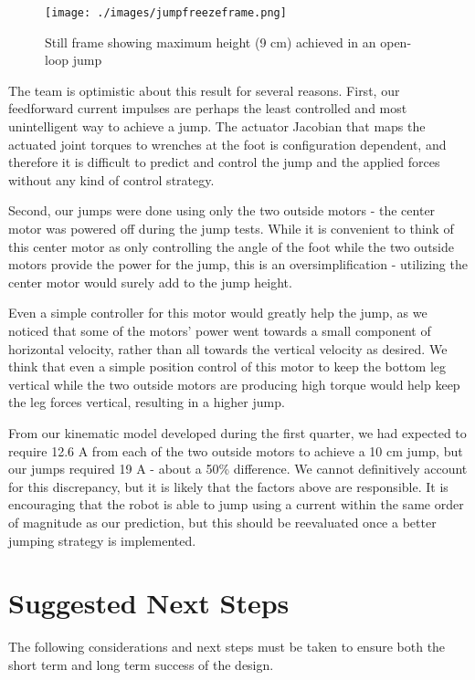 \documentclass{report}
\begin{document}
\begin{figure}[H]
\centering
\texttt{[image: ./images/jumpfreezeframe.png]}
\caption[Still frame showing maximum height (9 cm) achieved in an open-loop jump]{Still frame showing maximum height (9 cm) achieved in an open-loop jump}
\label{fig:jumpfreezeframe}
\end{figure}

The team is optimistic about this result for several reasons. First, our feedforward current impulses are perhaps the least controlled and most unintelligent way to achieve a jump. The actuator Jacobian that maps the actuated joint torques to wrenches at the foot is configuration dependent, and therefore it is difficult to predict and control the jump and the applied forces without any kind of control strategy. 

Second, our jumps were done using only the two outside motors - the center motor was powered off during the jump tests. While it is convenient to think of this center motor as only controlling the angle of the foot while the two outside motors provide the power for the jump, this is an oversimplification - utilizing the center motor would surely add to the jump height.

Even a simple controller for this motor would greatly help the jump, as we noticed that some of the motors' power went towards a small component of horizontal velocity, rather than all towards the vertical velocity as desired. We think that even a simple position control of this motor to keep the bottom leg vertical while the two outside motors are producing high torque would help keep the leg forces vertical, resulting in a higher jump.

From our kinematic model developed during the first quarter, we had expected to require 12.6 A from each of the two outside motors to achieve a 10 cm jump, but our jumps required 19 A - about a 50\% difference. We cannot definitively account for this discrepancy, but it is likely that the factors above are responsible. It is encouraging that the robot is able to jump using a current within the same order of magnitude as our prediction, but this should be reevaluated once a better jumping strategy is implemented.

\chapter[Suggested Next Steps]{Suggested Next Steps}
The following considerations and next steps must be taken to ensure both the short term and long term success of the design.
\end{document}

